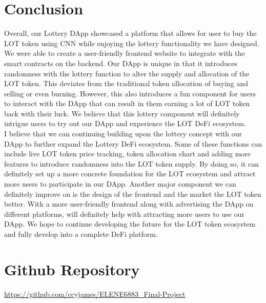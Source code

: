 \documentclass[11pt]{article}
\begin{document}
\section*{Conclusion}
Overall, our Lottery DApp showcased a platform that allows for user to buy the LOT token using CNN while enjoying the lottery functionality we have designed. We were able to create a user-friendly frontend website to integrate with the smart contracts on the backend. Our DApp is unique in that it introduces randomness with the lottery function to alter the supply and allocation of the LOT token. This deviates from the traditional token allocation of buying and selling or even burning. However, this also introduces a fun component for users to interact with the DApp that can result in them earning a lot of LOT token back with their luck. We believe that this lottery component will definitely intrigue users to try out our DApp and experience the LOT DeFi ecosystem.\\
I believe that we can continuing building upon the lottery concept with our DApp to further expand the Lottery DeFi ecosystem. Some of these functions can include live LOT token price tracking, token allocation chart and adding more features to introduce randomness into the LOT token supply. By doing so, it can definitely set up a more concrete foundation for the LOT ecosystem and attract more users to participate in our DApp. Another major component we can definitely improve on is the design of the frontend and the market the LOT token better. With a more user-friendly frontend along with advertising the DApp on different platforms, will definitely help with attracting more users to use our DApp. We hope to continue developing the future for the LOT token ecosystem and fully develop into a complete DeFi platform.

\newpage
\section*{Github Repository}
\url{https://github.com/ccyjames/ELENE6883_Final-Project}
\printbibliography[title = References]
\end{document}
